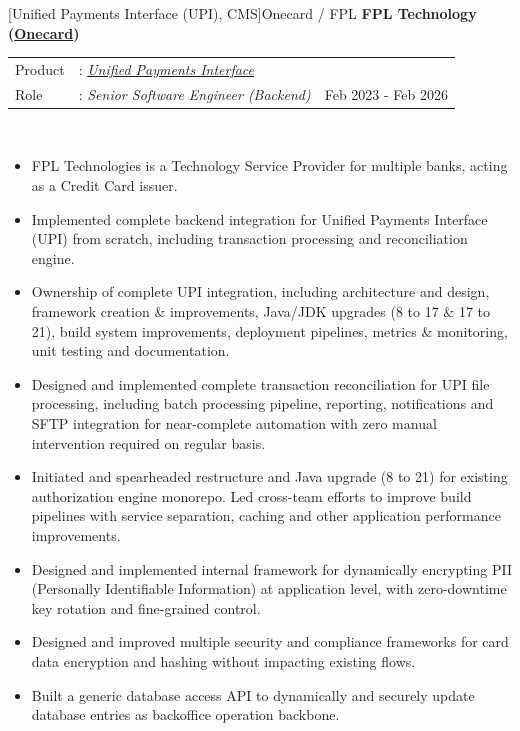 \documentclass[a4paper]{article}
\begin{document}
[Unified Payments Interface (UPI), CMS]{Onecard / FPL}
\textbf{FPL Technology (\href{https://www.getonecard.app/}{Onecard})} \\
\noindent
\begin{tabularx}{\textwidth}{ l l>{\raggedleft\arraybackslash}X}
	Product & : \textit{\href{https://en.wikipedia.org/wiki/Unified_Payments_Interface}{Unified Payments Interface}} &                      \\
	Role    & : \textit{Senior Software Engineer (Backend)}                                                          & Feb 2023 - Feb 2026 \\
\end{tabularx}
\textbf{} \\
\begin{itemize} \itemsep 1pt
	\item FPL Technologies is a Technology Service Provider for multiple banks, acting as a Credit Card issuer.
	\item Implemented complete backend integration for Unified Payments Interface (UPI) from scratch, including transaction processing and reconciliation engine.
	\item Ownership of complete UPI integration, including architecture and design, framework creation \& improvements, Java/JDK upgrades (8 to 17 \& 17 to 21), build system improvements, deployment pipelines, metrics \& monitoring, unit testing and documentation.
  \item Designed and implemented complete transaction reconciliation for UPI file processing, including batch processing pipeline, reporting, notifications and SFTP integration for near-complete automation with zero manual intervention required on regular basis.
	\item Initiated and spearheaded restructure and Java upgrade (8 to 21) for existing authorization engine monorepo. Led cross-team efforts to improve build pipelines with service separation, caching and other application performance improvements.
  \item Designed and implemented internal framework for dynamically encrypting PII (Personally Identifiable Information) at application level, with zero-downtime key rotation and fine-grained control.
  \item Designed and improved multiple security and compliance frameworks for card data encryption and hashing without impacting existing flows.
  \item Built a generic database access API to dynamically and securely update database entries as backoffice operation backbone.

\end{itemize}
\end{document}
